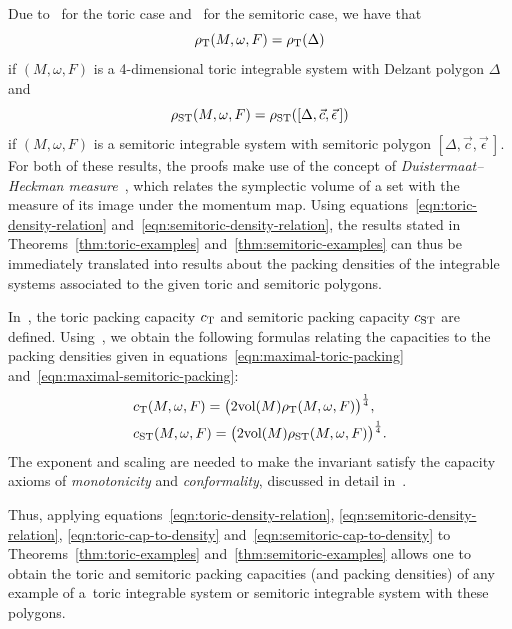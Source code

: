 \documentclass[10pt,a4paper]{amsart}
\numberwithin{equation}{section}
\newcommand{\De}{\Delta}
\newcommand{\om}{\omega}
\newcommand{\stpoly}{[\De,\vec{c},\vec{\epsilon}\,]}
\theoremstyle{definition}
\theoremstyle{plain}
\theoremstyle{plain}
\begin{document}
Due to~\cite[Lemma 2.12]{Pe2006} for the toric case and~\cite[Proposition 7.4]{FiPaPe2016} for the semitoric case, we have that
\begin{equation}\label{eqn:toric-density-relation}
 \rho_{{\rm T}}(M,\om,F) = \rho_{\rm T}(\De)
\end{equation}
if $(M,\om,F)$ is a 4-dimensional toric integrable system with Delzant polygon $\De$ and
\begin{equation}\label{eqn:semitoric-density-relation}
 \rho_{{\rm ST}}(M,\om,F) = \rho_{\rm ST}(\stpoly)
\end{equation}
if $(M,\om,F)$ is a semitoric integrable system with semitoric polygon $\stpoly$.
For both of these results, the proofs make use of the concept of \emph{Duistermaat--Heckman measure}~\cite{DH-measure}, which relates the symplectic volume of a set with the measure of its image under the momentum map.
Using equations~\eqref{eqn:toric-density-relation} and~\eqref{eqn:semitoric-density-relation}, the results stated in Theorems~\ref{thm:toric-examples} and~\ref{thm:semitoric-examples} can thus be immediately translated into results about the packing densities of the integrable systems associated to the given toric and semitoric polygons.



In~\cite{FiPaPe2016}, the toric packing capacity $c_{{\rm T}}$ and semitoric packing capacity $c_{{\rm ST}}$ are defined.
Using~\cite[equation (2)]{FiPaPe2016}, we obtain the following formulas relating the capacities to the packing densities given in equations~\eqref{eqn:maximal-toric-packing} and~\eqref{eqn:maximal-semitoric-packing}:
 \begin{align}
& c_{{\rm T}}(M,\om,F) = \big( 2 \text{vol}(M) \rho_{{\rm T}}(M,\om,F)\big)^{\frac{1}{4}},\label{eqn:toric-cap-to-density} \\
& c_{{\rm ST}}(M,\om,F) = \big( 2 \text{vol}(M) \rho_{{\rm ST}}(M,\om,F) \big)^{\frac{1}{4}}.\label{eqn:semitoric-cap-to-density}
 \end{align}
 The exponent and scaling are needed to make the invariant satisfy the capacity axioms of \emph{monotonicity} and \emph{conformality}, discussed in detail in~\cite{FiPaPe2016}.


Thus, applying equations~\eqref{eqn:toric-density-relation},
\eqref{eqn:semitoric-density-relation}, \eqref{eqn:toric-cap-to-density}
and~\eqref{eqn:semitoric-cap-to-density} to Theorems~\ref{thm:toric-examples}
and~\ref{thm:semitoric-examples} allows one to obtain the toric and semitoric packing capacities (and packing densities) of any example of a~toric integrable system or semitoric integrable system with these polygons.
\end{document}
